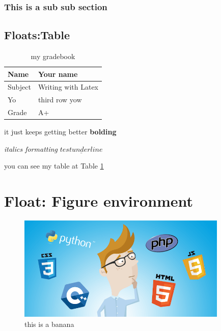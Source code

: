 \documentclass{article}
\begin{document}
\subsubsection{This is a sub sub section}

\subsection{Floats:Table}

\begin{table}[htbp]
	\caption{my gradebook}
	\begin{center}
		\begin{tabular}{|l|l|}
			\hline
			Name    & Your name          \\
			\hline
			Subject & Writing with Latex \\
			\hline
			Yo      & third row yow      \\
			\hline
			Grade   & A+                 \\
			\hline
		\end{tabular}
	\end{center}
	\label{tab:grades}
\end{table}

it just keeps getting better \textbf{bolding}

\emph{italics formatting}
$\underline{test underline}$

you can see my table at Table \ref{tab:grades}

\section{Float: Figure environment}

\begin{figure}[htbp]
	\begin{center}
		\includegraphics[width=10cm]{latex.png}
		\caption{this is a banana}
		\label{fig:banana}
	\end{center}
\end{figure}
\end{document}
